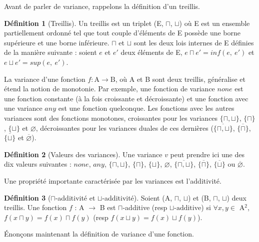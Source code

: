 \documentclass{rapport}
\theoremstyle{plain}
\theoremstyle{remark}
\theoremstyle{definition}
\newtheorem{dfn}{Définition}
\begin{document}
Avant de parler de variance, rappelons la définition d'un treillis. 

\begin{dfn} [Treillis] Un treillis est un triplet (E, $\sqcap$, $\sqcup$) où E est un ensemble partiellement ordonné tel que tout couple d'éléments de E possède une borne supérieure et une borne inférieure. $\sqcap$ et $\sqcup$ sont les deux lois internes de E définies de la manière suivante : soient $e$ et $e'$ deux éléments de E, $e \sqcap e' = inf(e,\ e')$ et $e \sqcup e' = sup(e,\ e')$.
\end{dfn}

La variance d'une fonction ${f : \text{A} \rightarrow \text{B}}$, où A et B sont deux treillis, généralise et étend la notion de monotonie. Par exemple, une fonction de variance $none$ est une fonction constante (à la fois croissante et décroissante) et une fonction avec une variance $any$ est une fonction quelconque. Les fonctions avec les autres variances sont des fonctions monotones, croissantes pour les variances $\{\sqcap, \sqcup\}$, $\{\sqcap\}$, $\{\sqcup\}$ et $\varnothing$, décroissantes pour les variances duales de ces dernières ($\overline{\{\sqcap, \sqcup\}}$, $\overline{\{\sqcap\}}$, $\overline{\{\sqcup\}}$ et $\overline{\varnothing}$).    

\begin{dfn}[Valeurs des variances] Une variance $v$ peut prendre ici une des dix valeurs suivantes : $none$, $any$, $\{\sqcap, \sqcup\}$, $\{\sqcap\}$, $\{\sqcup\}$, $\varnothing$, $\overline{\{\sqcap, \sqcup\}}$, $\overline{\{\sqcap\}}$, $\overline{\{\sqcup\}}$ ou $\overline{\varnothing}$.
\end{dfn} 

Une propriété importante caractérisée par les variances est l'additivité. 

\begin{dfn}[$\sqcap$-additivité et $\sqcup$-additivité] Soient (A, $\sqcap$, $\sqcup$) et (B, $\sqcap$, $\sqcup$) deux treillis. Une fonction $f$ : A $\rightarrow$ B est $\sqcap$-additive (resp $\sqcup\text{-additive}$) si $\forall x, y \in$ A$^2$, $f(x \sqcap y) = f(x) \sqcap f(y)$ (resp $f(x \sqcup y) = f(x) \sqcup f(y)$).
\end{dfn}

Énonçons maintenant la définition de variance d'une fonction. 
\end{document}
